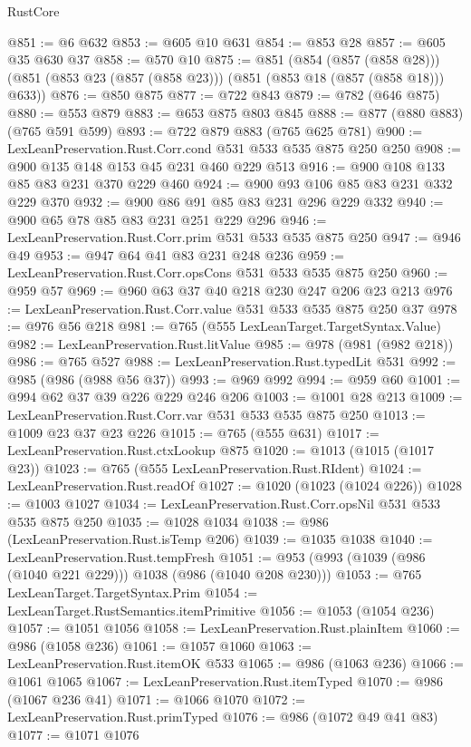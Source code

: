 \begin{lexlean}{RustCore}
\begin{coremodule}
@851 := @6 @632
@853 := @605 @10 @631
@854 := @853 @28
@857 := @605 @35 @630 @37
@858 := @570 @10
@875 := @851
    (@854 (@857 (@858 @28)))
    (@851 (@853 @23 (@857 (@858 @23))) (@851 (@853 @18 (@857 (@858 @18))) @633))
@876 := @850 @875
@877 := @722 @843
@879 := @782 (@646 @875)
@880 := @553 @879
@883 := @653 @875 @803 @845
@888 := @877 (@880 @883) (@765 @591 @599)
@893 := @722 @879 @883 (@765 @625 @781)
@900 := LexLeanPreservation.Rust.Corr.cond @531 @533 @535 @875 @250 @250
@908 := @900 @135 @148 @153 @45 @231 @460 @229 @513
@916 := @900 @108 @133 @85 @83 @231 @370 @229 @460
@924 := @900 @93 @106 @85 @83 @231 @332 @229 @370
@932 := @900 @86 @91 @85 @83 @231 @296 @229 @332
@940 := @900 @65 @78 @85 @83 @231 @251 @229 @296
@946 := LexLeanPreservation.Rust.Corr.prim @531 @533 @535 @875 @250
@947 := @946 @49
@953 := @947 @64 @41 @83 @231 @248 @236
@959 := LexLeanPreservation.Rust.Corr.opsCons @531 @533 @535 @875 @250
@960 := @959 @57
@969 := @960 @63 @37 @40 @218 @230 @247 @206 @23 @213
@976 := LexLeanPreservation.Rust.Corr.value @531 @533 @535 @875 @250 @37
@978 := @976 @56 @218
@981 := @765 (@555 LexLeanTarget.TargetSyntax.Value)
@982 := LexLeanPreservation.Rust.litValue
@985 := @978 (@981 (@982 @218))
@986 := @765 @527
@988 := LexLeanPreservation.Rust.typedLit @531
@992 := @985 (@986 (@988 @56 @37))
@993 := @969 @992
@994 := @959 @60
@1001 := @994 @62 @37 @39 @226 @229 @246 @206
@1003 := @1001 @28 @213
@1009 := LexLeanPreservation.Rust.Corr.var @531 @533 @535 @875 @250
@1013 := @1009 @23 @37 @23 @226
@1015 := @765 (@555 @631)
@1017 := LexLeanPreservation.Rust.ctxLookup @875
@1020 := @1013 (@1015 (@1017 @23))
@1023 := @765 (@555 LexLeanPreservation.Rust.RIdent)
@1024 := LexLeanPreservation.Rust.readOf
@1027 := @1020 (@1023 (@1024 @226))
@1028 := @1003 @1027
@1034 := LexLeanPreservation.Rust.Corr.opsNil @531 @533 @535 @875 @250
@1035 := @1028 @1034
@1038 := @986 (LexLeanPreservation.Rust.isTemp @206)
@1039 := @1035 @1038
@1040 := LexLeanPreservation.Rust.tempFresh
@1051 := @953 (@993 (@1039 (@986 (@1040 @221 @229))) @1038 (@986 (@1040 @208 @230)))
@1053 := @765 LexLeanTarget.TargetSyntax.Prim
@1054 := LexLeanTarget.RustSemantics.itemPrimitive
@1056 := @1053 (@1054 @236)
@1057 := @1051 @1056
@1058 := LexLeanPreservation.Rust.plainItem
@1060 := @986 (@1058 @236)
@1061 := @1057 @1060
@1063 := LexLeanPreservation.Rust.itemOK @533
@1065 := @986 (@1063 @236)
@1066 := @1061 @1065
@1067 := LexLeanPreservation.Rust.itemTyped
@1070 := @986 (@1067 @236 @41)
@1071 := @1066 @1070
@1072 := LexLeanPreservation.Rust.primTyped
@1076 := @986 (@1072 @49 @41 @83)
@1077 := @1071 @1076

\end{coremodule}
\end{lexlean}
